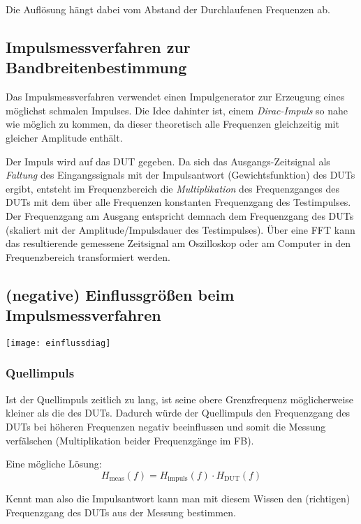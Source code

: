 \documentclass[a4paper, 12pt]{article}
\begin{document}
Die Auflösung hängt dabei vom Abstand der Durchlaufenen Frequenzen ab.

\subsection{Impulsmessverfahren zur Bandbreitenbestimmung}
Das Impulsmessverfahren verwendet einen Impulgenerator zur Erzeugung eines
möglichst schmalen Impulses. Die Idee dahinter ist, einem \emph{Dirac-Impuls} so
nahe wie möglich zu kommen, da dieser theoretisch alle Frequenzen gleichzeitig
mit gleicher Amplitude enthält.

Der Impuls wird auf das DUT gegeben. Da sich das Ausgangs-Zeitsignal als \emph{Faltung}
des Eingangssignals mit der Impulsantwort (Gewichtsfunktion) des DUTs ergibt, entsteht im
Frequenzbereich die \emph{Multiplikation} des Frequenzganges des DUTs mit dem
über alle Frequenzen konstanten Frequenzgang des Testimpulses. Der Frequenzgang
am Ausgang entspricht demnach dem Frequenzgang des DUTs (skaliert mit der
Amplitude/Impulsdauer des Testimpulses). Über eine FFT kann das resultierende gemessene Zeitsignal am Oszilloskop oder am Computer in den Frequenzbereich
transformiert werden.

\subsection{(negative) Einflussgrößen beim Impulsmessverfahren}
\texttt{[image: einflussdiag]}

\subsubsection{Quellimpuls}
Ist der Quellimpuls zeitlich zu lang, ist seine obere Grenzfrequenz
möglicherweise kleiner als die des DUTs. Dadurch würde der Quellimpuls den
Frequenzgang des DUTs bei höheren Frequenzen negativ beeinflussen und somit die
Messung verfälschen (Multiplikation beider Frequenzgänge im FB).

Eine mögliche Lösung:
\[H_{\mathrm{meas}}(f) = H_{\mathrm{impuls}}(f) \cdot H_{\textrm{DUT}}(f)\]

Kennt man also die Impulsantwort kann man mit diesem Wissen den (\glqq richtigen\grqq) Frequenzgang des
DUTs aus der Messung bestimmen.
\end{document}

